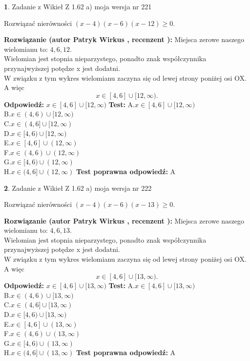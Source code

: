 \documentclass[12pt, a4paper]{article}
\theoremstyle{definition} %
\newtheorem{zad}{}
\newcommand{\zadStart}[1]{\begin{zad}#1\newline}
\newcommand{\zadStop}{\end{zad}}
\newcommand{\rozwStart}[2]{\noindent \textbf{Rozwiązanie (autor #1 , recenzent #2): }\newline}
\newcommand{\rozwStop}{\newline}
\newcommand{\odpStart}{\noindent \textbf{Odpowiedź:}\newline}
\newcommand{\odpStop}{\newline}
\newcommand{\testStart}{\noindent \textbf{Test:}\newline}
\newcommand{\testStop}{\newline}
\newcommand{\kluczStart}{\noindent \textbf{Test poprawna odpowiedź:}\newline}
\newcommand{\kluczStop}{\newline}
\begin{document}
\zadStart{Zadanie z Wikieł Z 1.62 a) moja wersja nr 221}

Rozwiązać nierówności $(x-4)(x-6)(x-12)\ge0$.
\zadStop
\rozwStart{Patryk Wirkus}{}
Miejsca zerowe naszego wielomianu to: $4, 6, 12$.\\
Wielomian jest stopnia nieparzystego, ponadto znak współczynnika przy\linebreak najwyższej potędze x jest dodatni.\\ W związku z tym wykres wielomianu zaczyna się od lewej strony poniżej osi OX. A więc $$x \in [4,6] \cup [12,\infty).$$
\rozwStop
\odpStart
$x \in [4,6] \cup [12,\infty)$
\odpStop
\testStart
A.$x \in [4,6] \cup [12,\infty)$\\
B.$x \in (4,6) \cup [12,\infty)$\\
C.$x \in (4,6] \cup [12,\infty)$\\
D.$x \in [4,6) \cup [12,\infty)$\\
E.$x \in [4,6] \cup (12,\infty)$\\
F.$x \in (4,6) \cup (12,\infty)$\\
G.$x \in [4,6) \cup (12,\infty)$\\
H.$x \in (4,6] \cup (12,\infty)$
\testStop
\kluczStart
A
\kluczStop



\zadStart{Zadanie z Wikieł Z 1.62 a) moja wersja nr 222}

Rozwiązać nierówności $(x-4)(x-6)(x-13)\ge0$.
\zadStop
\rozwStart{Patryk Wirkus}{}
Miejsca zerowe naszego wielomianu to: $4, 6, 13$.\\
Wielomian jest stopnia nieparzystego, ponadto znak współczynnika przy\linebreak najwyższej potędze x jest dodatni.\\ W związku z tym wykres wielomianu zaczyna się od lewej strony poniżej osi OX. A więc $$x \in [4,6] \cup [13,\infty).$$
\rozwStop
\odpStart
$x \in [4,6] \cup [13,\infty)$
\odpStop
\testStart
A.$x \in [4,6] \cup [13,\infty)$\\
B.$x \in (4,6) \cup [13,\infty)$\\
C.$x \in (4,6] \cup [13,\infty)$\\
D.$x \in [4,6) \cup [13,\infty)$\\
E.$x \in [4,6] \cup (13,\infty)$\\
F.$x \in (4,6) \cup (13,\infty)$\\
G.$x \in [4,6) \cup (13,\infty)$\\
H.$x \in (4,6] \cup (13,\infty)$
\testStop
\kluczStart
A
\kluczStop
\end{document}
